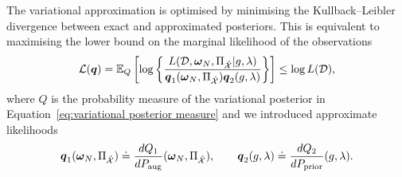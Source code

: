 \documentclass[twoside,11pt]{article}
\newcommand{\dataset}{{\cal D}}
\newcommand{\EE}[2]{\mathbb{E}_{#1}\left[ #2 \right]}
\newcommand{\set}[1]{\left\lbrace #1 \right\rbrace}
\newcommand{\bs}[1]{\boldsymbol{#1}}
\newcommand{\bx}{\boldsymbol{x}}
\newcommand{\bomega}{\boldsymbol{\omega}}
\newcommand{\PG}{p_{\scriptscriptstyle \mathrm{PG}}}
\newcommand{\X}{\mathcal{X}}
\begin{document}
The variational approximation is optimised by minimising the Kullback--Leibler divergence between exact and approximated posteriors. This is equivalent to maximising the  lower bound on the marginal likelihood of the observations
\begin{equation}\label{eq:lower bound}
\mathcal{L}(\bs{q}) = \EE{Q}{\log \left\{\frac{L(\dataset, \bomega_N, \Pi_{\hat{\X}} \vert g, \lambda)}
{\bs{q}_1(\bomega_N, \Pi_{\hat{\X}})\bs{q}_2(g,\lambda)}
\right\}} \leq \log L(\dataset),
\end{equation}
where $Q$ is the probability measure of the variational posterior in Equation~\eqref{eq:variational posterior measure} and we introduced approximate likelihoods
\begin{equation}
\bs{q}_1(\bomega_N, \Pi_{\hat{\X}})\doteq \frac{dQ_1}{dP_{\rm aug}}
(\bomega_N, \Pi_{\hat{\X}}), \qquad
\bs{q}_2(g,\lambda) \doteq \frac{dQ_2}{dP_{\rm prior}}(g,\lambda).
\end{equation}
\end{document}
